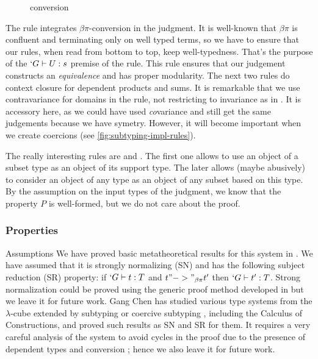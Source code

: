 \documentclass[twocolumn]{article}
\begin{document}
\begin{figure}[h]
  \subtdRules
  \caption{\Russell{} conversion}
  \label{fig:conversion-decl-rules}
\end{figure}

The rule  integrates $\beta\pi$-conversion in the
judgment. It is well-known \cite{Luo, Pottinger?} that $\beta\pi$ is
confluent and terminating only on well typed terms, so we have to
ensure that our rules, when read from bottom to top, keep
well-typedness. That's the purpose of
the $`G \vdash U : s$ premise of the  rule. This rule
ensures that our judgement constructs an \emph{equivalence} and has
proper modularity. The next two rules do context closure for dependent
products and sums. It is remarkable that we use contravariance
\cite{journals/toplas/Castagna95} for
domains in the  rule, not restricting to invariance as in
\PVS. It is accessory here, as we could have used \emph{co}variance and
still get the same judgements because we have symetry. However, it will
become important when we create coercions (see
\vref{fig:subtyping-impl-rules}).

The really interesting rules are  and
. The first one allows to use an object of a subset type
as an object of its support type. The later allows (maybe abusively) to
consider an object of any type as an object of any subset based on
this type. By the assumption on the input types of the judgment, we know
that the property $P$ is well-formed, but we do not care about the proof.

\subsubsection{Properties}
\begin{paragraph}{Assumptions}
  We have proved basic metatheoretical results for this system in \Coq{}
  \cite{CCP}. We have assumed that it is strongly normalizing (SN) and has the
  following subject reduction (SR) property: if $`G \vdash t : T$ and $t
  "->"_{\beta\pi} t'$ then $`G \vdash t' : T$. Strong normalization
  could be proved using the generic proof method developed in
  \cite{Geuvers} but we leave it for future work. Gang Chen
  \cite{GangChen} has studied various type systems from the
  $\lambda$-cube extended by subtyping or coercive subtyping \cite{Luo},
  including the Calculus of Constructions, and proved such results as
  SN and SR for them. It requires a very careful analysis of the system 
  to avoid cycles in the proof due to the presence of dependent types and
  conversion ; hence we also leave it for future work.
\end{paragraph}
\end{document}
